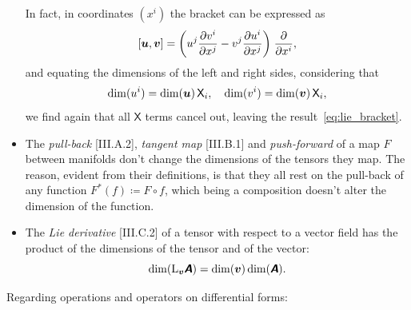 \documentclass[a4paper,12pt,onecolumn,oneside,article,british]{memoir}
\newcommand*{\mathte}[1]{\textbf{\textit{\textsf{#1}}}}
\newcommand*{\de}{\partial}%
\newcommand*{\defd}{\coloneqq}
\DeclarePairedDelimiter\clcl{[}{]}
\newcommand*{\Xx}{\textsf{X}}
\newcommand*{\Li}{\mathrm{L}}
\newcommand*{\yA}{\mathte{A}}
\newcommand*{\yB}{\mathte{B}}
\newcommand*{\yv}{\bm{v}}
\newcommand*{\yu}{\bm{u}}
\renewcommand*{\i}{\indices}
\newcommand*{\dex}[1][i]{\frac{\de}{\de x^{#1}}}
\begin{document}
\begin{itemize}[wide=0pt]
In fact, in coordinates $(x^{i})$ the bracket can be expressed as
\begin{equation}
  \label{eq:bracket_coords}
  \clcl{\yu,\yv} =
  \biggl( u\i{^{j}}\frac{\de v\i{^{i}}}{\de x\i{^{j}}}
  - v\i{^{j}}\frac{\de u\i{^{i}}}{\de x\i{^{j}}} \biggr)\;\dex,
\end{equation}
and equating the dimensions of the left and right sides, considering that
\begin{equation}
  \label{eq:dim_u_and_v}
  \dim(u\i{^{i}}) = \dim(\yu)\,\Xx_{i},\quad
  \dim(v\i{^{i}}) = \dim(\yv)\,\Xx_{i},
\end{equation}
we find again that all $\Xx$ terms cancel out, leaving the
result~\eqref{eq:lie_bracket}.

\smallskip


\item The \emph{pull-back} [III.A.2], \emph{tangent map} [III.B.1] and
  \emph{push-forward} of a map $F$ between manifolds don't change the
  dimensions of the tensors they map. The reason, evident from their
  definitions, is that they all rest on the pull-back of any function
  $F^{*}(f) \defd F\circ f$, which being a composition doesn't alter the
  dimension of the function.

\item The \emph{Lie derivative} [III.C.2] of a tensor with respect to a
  vector field has the product of the dimensions of the tensor and of the
  vector:
  \begin{equation}
    \dim(\Li_{\yv}\yA) =\dim(\yv)\dim(\yA).
    \label{eq:lie_der}
\end{equation}
\end{itemize}

\medskip

Regarding operations and operators on differential forms:
\end{document}

